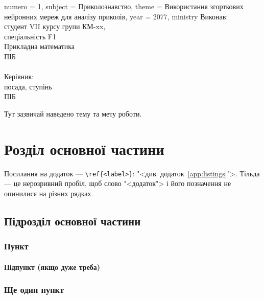 \documentclass{pma-report}
\begin{document}
\begin{titlepage}{
    numero = {1}, %
    subject = {Приколознавство},
    theme = {Використання згорткових нейронних мереж для аналізу приколів}, %
    year = {2077},
    ministry %
}
    Виконав:\\
    студент VII курсу групи КМ-xx,\\
    спеціальність F1\\
    Прикладна математика\\
    ПІБ\\ %
    \\
    Керівник:\\
    посада, ступінь\\
    ПІБ
\end{titlepage}

\tableofcontents

\intro
Тут зазвичай наведено тему та мету роботи.

\chapter{Розділ основної частини}
Посилання на додаток --- \verb|\ref{<label>}|: "<див. додаток~\ref{app:listings}">. Тільда --- це нерозривний пробіл, щоб слово "<додаток"> і його позначення не опинилися на різних рядках.

\section{Підрозділ основної частини}
\subsection{Пункт}
\subsubsection{Підпункт (якщо дуже треба)}
\subsection{Ще один пункт}

\end{document}
